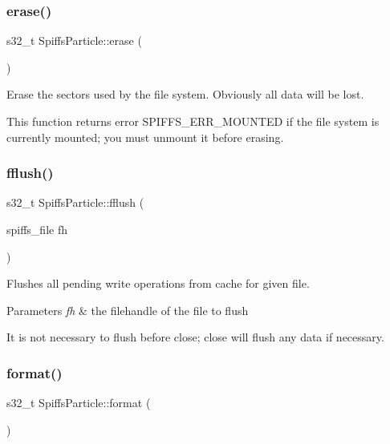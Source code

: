 \subsubsection{\texorpdfstring{erase()}{erase()}}
{\footnotesize\ttfamily s32\+\_\+t Spiffs\+Particle\+::erase (\begin{DoxyParamCaption}{ }\end{DoxyParamCaption})}



Erase the sectors used by the file system. Obviously all data will be lost. 

This function returns error S\+P\+I\+F\+F\+S\+\_\+\+E\+R\+R\+\_\+\+M\+O\+U\+N\+T\+ED if the file system is currently mounted; you must unmount it before erasing. \mbox{\label{class_spiffs_particle_a32b335384933ca63e6f8026759ced629}} 
\subsubsection{\texorpdfstring{fflush()}{fflush()}}
{\footnotesize\ttfamily s32\+\_\+t Spiffs\+Particle\+::fflush (\begin{DoxyParamCaption}\item[{spiffs\+\_\+file}]{fh }\end{DoxyParamCaption})\hspace{0.3cm}{\ttfamily [inline]}}



Flushes all pending write operations from cache for given file. 


\begin{DoxyParams}{Parameters}
{\em fh} & the filehandle of the file to flush\\
\hline
\end{DoxyParams}
It is not necessary to flush before close; close will flush any data if necessary. \mbox{\label{class_spiffs_particle_a31500330ba98a081bc7b41f027406bf0}} 
\subsubsection{\texorpdfstring{format()}{format()}}
{\footnotesize\ttfamily s32\+\_\+t Spiffs\+Particle\+::format (\begin{DoxyParamCaption}{ }\end{DoxyParamCaption})\hspace{0.3cm}{\ttfamily [inline]}}




